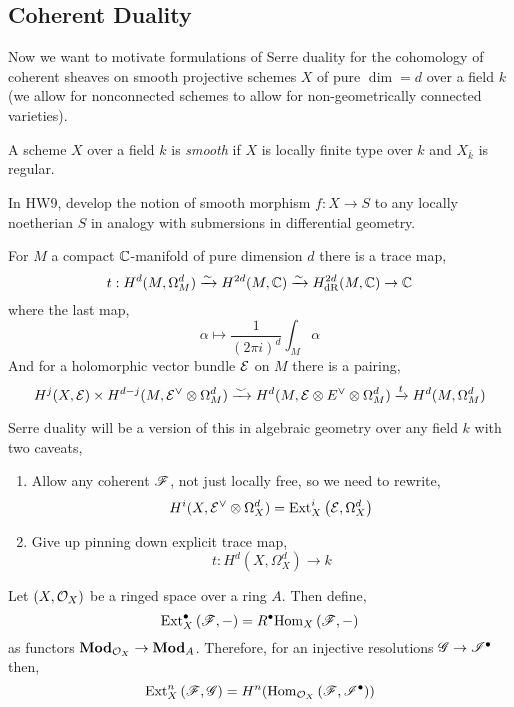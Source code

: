 \documentclass[12pt]{article}
\begin{document}
\subsection{Coherent Duality}

Now we want to motivate formulations of Serre duality for the cohomology of coherent sheaves on smooth projective schemes $X$ of pure $\dim = d$ over a field $k$ (we allow for nonconnected schemes to allow for non-geometrically connected varieties). 

\begin{defn}
A scheme $X$ over a field $k$ is \textit{smooth} if $X$ is locally finite type over $k$ and $X_{\bar{k}}$ is regular. 
\end{defn}

\begin{rmk}
In HW9, develop the notion of smooth morphism $f : X \to S$ to any locally noetherian $S$ in analogy with submersions in differential geometry. 
\end{rmk}

\begin{rmk}
For $M$ a compact $\mathbb{C}$-manifold of pure dimension $d$ there is a trace map,
\[ t : H^d(M, \Omega^d_M) \xrightarrow{\sim} H^{2d}(M, \mathbb{C}) \xrightarrow{\sim} H_{\mathrm{dR}}^{2d}(M, \mathbb{C}) \to \mathbb{C} \]
where the last map,
\[ \alpha \mapsto \frac{1}{(2 \pi i)^d} \int_M \alpha \]
And for a holomorphic vector bundle $\mathcal{E}$ on $M$ there is a pairing,
\[ H^j(X, \mathcal{E}) \times H^{d-j}(M, \mathcal{E}^\vee \otimes \Omega^d_M) \xrightarrow{\smile} H^d(M, \mathcal{E} \otimes E^\vee \otimes \Omega^d_M) \xrightarrow{t} H^d(M, \Omega^d_M) \]
\end{rmk}

\begin{rmk}
Serre duality will be a version of this in algebraic geometry over any field $k$ with two caveats,
\begin{enumerate}
\item Allow any coherent $\mathscr{F}$, not just locally free, so we need to rewrite,
\[ H^i(X, \mathcal{E}^\vee \otimes \Omega_X^d) = \mathrm{Ext}^{i}_{X} \left( \mathcal{E}, \Omega_X^d \right) \]
\item Give up pinning down explicit trace map,
\[ t : H^d(X, \Omega^d_X) \to k \]
\end{enumerate}
\end{rmk}

\begin{defn}
Let $(X, \mathcal{O}_{X})$ be a ringed space over a ring $A$. Then define, 
\[ \mathrm{Ext}^{\bullet}_{X} \left( \mathscr{F}, - \right) = R^\bullet \mathrm{Hom}_{X} \left( \mathscr{F}, - \right)  \]
as functors $\mathbf{Mod}_{\mathcal{O}_{X}} \to \mathbf{Mod}_{A}$. Therefore, for an injective resolutions $\mathscr{G} \to \mathscr{I}^\bullet$ then,
\[ \mathrm{Ext}^{n}_{X} \left( \mathscr{F}, \mathscr{G} \right) = H^n(\mathrm{Hom}_{\mathcal{O}_{X}} \left( \mathscr{F}, \mathscr{I}^\bullet \right)) \]
\end{defn}
\end{document}
